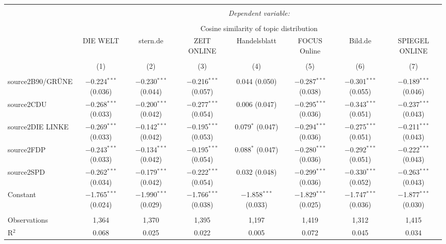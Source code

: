 \documentclass[
]{article}
\begin{document}
\begin{table}[!htbp] \centering 
  \caption{} 
  \label{} 
\tiny 
\begin{tabular}{@{\extracolsep{5pt}}lccccccc} 
\\[-1.8ex]\hline 
\hline \\[-1.8ex] 
 & \multicolumn{7}{c}{\textit{Dependent variable:}} \\ 
\cline{2-8} 
\\[-1.8ex] & \multicolumn{7}{c}{Cosine similarity of topic distribution} \\ 
 & DIE WELT & stern.de & ZEIT ONLINE & Handelsblatt & FOCUS Online & Bild.de & SPIEGEL ONLINE \\ 
\\[-1.8ex] & (1) & (2) & (3) & (4) & (5) & (6) & (7)\\ 
\hline \\[-1.8ex] 
 source2B90/GRÜNE & $-$0.224$^{***}$ (0.036) & $-$0.230$^{***}$ (0.044) & $-$0.216$^{***}$ (0.057) & 0.044 (0.050) & $-$0.287$^{***}$ (0.038) & $-$0.301$^{***}$ (0.055) & $-$0.189$^{***}$ (0.046) \\ 
  source2CDU & $-$0.268$^{***}$ (0.033) & $-$0.200$^{***}$ (0.042) & $-$0.277$^{***}$ (0.054) & 0.006 (0.047) & $-$0.295$^{***}$ (0.036) & $-$0.343$^{***}$ (0.051) & $-$0.237$^{***}$ (0.043) \\ 
  source2DIE LINKE & $-$0.269$^{***}$ (0.033) & $-$0.142$^{***}$ (0.042) & $-$0.195$^{***}$ (0.053) & 0.079$^{*}$ (0.047) & $-$0.294$^{***}$ (0.036) & $-$0.275$^{***}$ (0.051) & $-$0.211$^{***}$ (0.043) \\ 
  source2FDP & $-$0.243$^{***}$ (0.033) & $-$0.134$^{***}$ (0.042) & $-$0.195$^{***}$ (0.054) & 0.088$^{*}$ (0.047) & $-$0.280$^{***}$ (0.036) & $-$0.292$^{***}$ (0.051) & $-$0.222$^{***}$ (0.043) \\ 
  source2SPD & $-$0.262$^{***}$ (0.034) & $-$0.179$^{***}$ (0.042) & $-$0.222$^{***}$ (0.054) & 0.032 (0.048) & $-$0.299$^{***}$ (0.036) & $-$0.330$^{***}$ (0.052) & $-$0.263$^{***}$ (0.043) \\ 
  Constant & $-$1.765$^{***}$ (0.024) & $-$1.990$^{***}$ (0.029) & $-$1.766$^{***}$ (0.038) & $-$1.858$^{***}$ (0.033) & $-$1.829$^{***}$ (0.025) & $-$1.747$^{***}$ (0.036) & $-$1.877$^{***}$ (0.030) \\ 
 \hline \\[-1.8ex] 
Observations & 1,364 & 1,370 & 1,395 & 1,197 & 1,419 & 1,312 & 1,415 \\ 
R$^{2}$ & 0.068 & 0.025 & 0.022 & 0.005 & 0.072 & 0.045 & 0.034 \\ 

\end{tabular}
\end{table}
\end{document}
